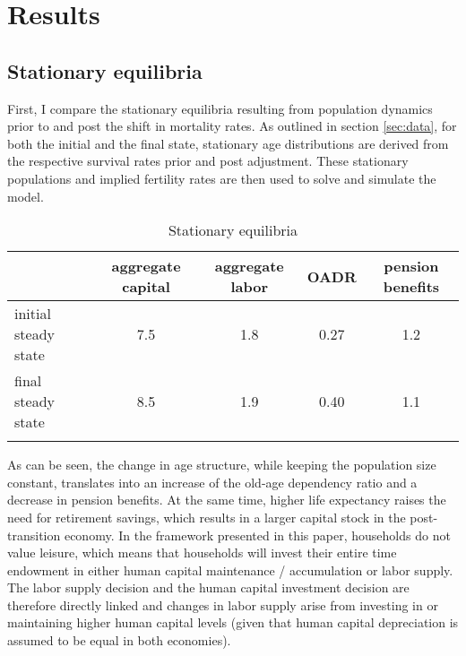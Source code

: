 \section{Results}
\label{sec:results}

\subsection{Stationary equilibria}

First, I compare the stationary equilibria resulting from population dynamics prior to and post the shift in mortality rates. As outlined in section \ref{sec:data}, for both the initial and the final state, stationary age distributions are derived from the respective survival rates prior and post adjustment. These stationary populations and implied fertility rates are then used to solve and simulate the model.

\begin{table}[ht]
    \caption{Stationary equilibria}
    \label{tab:stationary_aggregates}
    \centering
    \begin{tabular}{l c c c c}
        \hline \hline
                                &aggregate capital  & aggregate labor   & OADR  & pension benefits \\
        \hline
        initial steady state    &7.5                &1.8                &0.27   &1.2  \\
        final steady state      &8.5                &1.9                &0.40   &1.1  \\
        \hline \hline \\
    \end{tabular}
\end{table}

As can be seen, the change in age structure, while keeping the population size constant, translates into an increase of the old-age dependency ratio and a decrease in pension benefits. At the same time, higher life expectancy raises the need for retirement savings, which results in a larger capital stock in the post-transition economy. In the framework presented in this paper, households do not value leisure, which means that households will invest their entire time endowment in either human capital maintenance / accumulation or labor supply. The labor supply decision and the human capital investment decision are therefore directly linked and changes in labor supply arise from investing in or maintaining higher human capital levels (given that human capital depreciation is assumed to be equal in both economies).